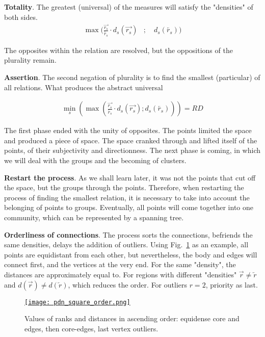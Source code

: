 \documentclass[12pt, a4paper, twocolumn]{article}
\newcommand{\githubPics}{https://raw.githubusercontent.com/artamono1/druhg/master/papers/druhg/}
\begin{document}
\textbf{Totality}. The greatest (universal) of the measures will satisfy the "densities" of both sides.
\begin{align*}
  \max(\frac{\overrightarrow{r_{s}} } {\overleftarrow{r_{s}}} \cdot d_{s}(\overrightarrow{r_{s}})&; \quad d_{s}(\overleftarrow{r_{s}}))
  \end{align*}

The opposites within the relation are resolved, but the oppositions of the plurality remain.

\textbf{Assertion}. The second negation of plurality is to find the smallest (particular) of all relations. What produces the abstract universal

\begin{align}
  \min_s( \max(\frac{\overrightarrow{r_{s}}} {\overleftarrow{r_{s}}} \cdot d_{s}(\overrightarrow{r_{s}}) ; d_{s}(\overleftarrow{r_{s}}))) = RD \label{formula:BorderRD}
\end{align}

The first phase ended with the unity of opposites. The points limited the space and produced a piece of space. The space cranked through and lifted itself of the points, of their subjectivity and directionness. The next phase is coming, in which we will deal with the groups and the becoming of clusters.

\textbf{Restart the process}. As we shall learn later, it was not the points that cut off the space, but the groups through the points. Therefore, when restarting the process of finding the smallest relation, it is necessary to take into account the belonging of points to groups. Eventually, all points will come together into one community, which can be represented by a spanning tree\cite{strMST}.

\textbf{Orderliness of connections}. The process sorts the connections, befriends the same densities, delays the addition of outliers. Using Fig.~\ref{fig:OrderSquare} as an example, all points are equidistant from each other, but nevertheless, the body and edges will connect first, and the vertices at the very end. For the same "density", the distances are approximately equal to. For regions with different "densities" $\overrightarrow{r} \neq \overleftarrow{r} $ and $d(\overrightarrow{r}) \neq d(\overleftarrow{r})$, which reduces the order. For outliers $r = 2$, priority as last.

\begin{figure}[H]
  \centering
  \href{\githubPics pdn_square_order.png}{\texttt{[image: pdn\_square\_order.png]}}
  \caption{Values of ranks and distances in ascending order: equidense core and edges, then core-edges, last vertex outliers.}\label{fig:OrderSquare}
\end{figure}
\end{document}
